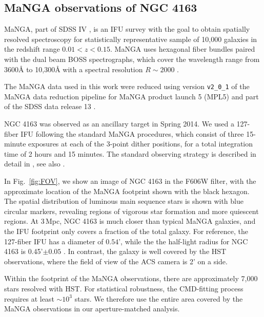 \documentclass[preprint2]{aastex62}
\newcommand{\ang}{\ensuremath{\mbox{\AA}}\xspace}
\begin{document}
\subsection{MaNGA observations of NGC 4163}\label{sec:data:manga}

MaNGA, part of SDSS IV \citep{Blanton+2017}, is an IFU survey with the goal to obtain spatially resolved spectroscopy for statistically representative sample of 10,000 galaxies in the redshift range $0.01 < z < 0.15$. MaNGA uses hexagonal fiber bundles paired with the dual beam BOSS spectrographs, which cover the wavelength range from 3600\ang to 10,300\ang with a spectral resolution $R\sim2000$ \citep{Smee+2013}.

The MaNGA data used in this work were reduced using version {\tt v2\_0\_1} of the MaNGA data reduction pipeline \citep{Law+2016} for MaNGA product launch 5 (MPL5) and part of the SDSS data release 13 \citep{Albareti+2017}.

NGC 4163 was observed as an ancillary target in Spring 2014. We used a 127-fiber IFU following the standard MaNGA procedures, which consist of three 15-minute exposures at each of the 3-point dither positions, for a total integration time of 2 hours and 15 minutes. The standard observing strategy is described in detail in \citet{Yan+2016}, see also \citet{Law+2015}.

In Fig.~\ref{fig:FOV}, we show an image of NGC 4163 in the F606W filter, with the approximate location of the MaNGA footprint shown with the black hexagon. The spatial distribution of luminous main sequence stars is shown with blue circular markers, revealing regions of vigorous star formation and more quiescent regions. At 3\,Mpc, NGC 4163 is much closer than typical MaNGA galaxies, and the IFU footprint only covers a fraction of the total galaxy. For reference, the 127-fiber IFU has a diameter of $0.54$', while the the half-light radius for NGC 4163 is 0.45'$\pm0.05$ \citep{McConnachie+2012}. In contrast, the galaxy is well covered by the HST observations, where the field of view of the ACS camera is 2' on a side.

Within the footprint of the MaNGA observations, there are approximately 7,000 stars resolved with HST. For statistical robustness, the CMD-fitting process requires at least ${\sim}10^3$ stars. We therefore use the entire area covered by the MaNGA observations in our aperture-matched analysis. 
\end{document}
